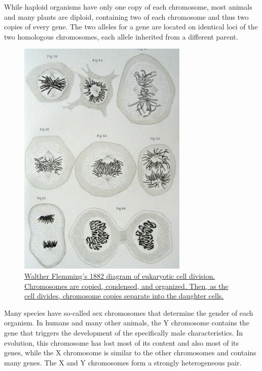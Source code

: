 While haploid organisms have only one copy of each chromosome, most animals and many plants are diploid, containing two of each chromosome and thus two copies of every gene. The two alleles for a gene are located on identical loci of the two homologous chromosomes, each allele inherited from a different parent.



\begin{figure}

{\centering \includegraphics[width=0.7\linewidth]{./figures/genetics/Zellsubstanz-Kern-Kerntheilung} 

}

\caption{\href{https://commons.wikimedia.org/wiki/File:Zellsubstanz-Kern-Kerntheilung.jpg}{Walther Flemming's 1882 diagram of eukaryotic cell division. Chromosomes are copied, condensed, and organized. Then, as the cell divides, chromosome copies separate into the daughter cells.}}\label{fig:celldivision}
\end{figure}

Many species have so-called sex chromosomes that determine the gender of each organism. In humans and many other animals, the Y chromosome contains the gene that triggers the development of the specifically male characteristics. In evolution, this chromosome has lost most of its content and also most of its genes, while the X chromosome is similar to the other chromosomes and contains many genes. The X and Y chromosomes form a strongly heterogeneous pair.


